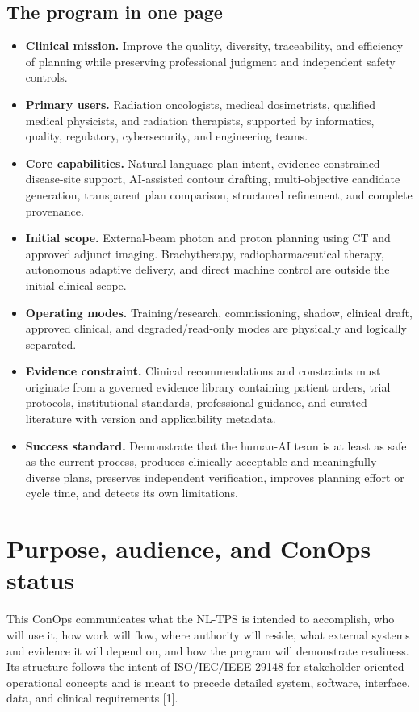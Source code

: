 \documentclass[11pt,letterpaper]{article}
\begin{document}
\subsection{The program in one page}

\begin{itemize}
\item \textbf{Clinical mission.} Improve the quality, diversity, traceability, and efficiency of planning while preserving professional judgment and independent safety controls.
\item \textbf{Primary users.} Radiation oncologists, medical dosimetrists, qualified medical physicists, and radiation therapists, supported by informatics, quality, regulatory, cybersecurity, and engineering teams.
\item \textbf{Core capabilities.} Natural-language plan intent, evidence-constrained disease-site support, AI-assisted contour drafting, multi-objective candidate generation, transparent plan comparison, structured refinement, and complete provenance.
\item \textbf{Initial scope.} External-beam photon and proton planning using CT and approved adjunct imaging. Brachytherapy, radiopharmaceutical therapy, autonomous adaptive delivery, and direct machine control are outside the initial clinical scope.
\item \textbf{Operating modes.} Training\slash\allowbreak{}research, commissioning, shadow, clinical draft, approved clinical, and degraded\slash\allowbreak{}read-only modes are physically and logically separated.
\item \textbf{Evidence constraint.} Clinical recommendations and constraints must originate from a governed evidence library containing patient orders, trial protocols, institutional standards, professional guidance, and curated literature with version and applicability metadata.
\item \textbf{Success standard.} Demonstrate that the human-AI team is at least as safe as the current process, produces clinically acceptable and meaningfully diverse plans, preserves independent verification, improves planning effort or cycle time, and detects its own limitations.
\end{itemize}

\section{Purpose, audience, and ConOps status}

This ConOps communicates what the NL-TPS is intended to accomplish, who will use it, how work will flow, where authority will reside, what external systems and evidence it will depend on, and how the program will demonstrate readiness. Its structure follows the intent of ISO\slash\allowbreak{}IEC\slash\allowbreak{}IEEE 29148 for stakeholder-oriented operational concepts and is meant to precede detailed system, software, interface, data, and clinical requirements [1].
\end{document}
